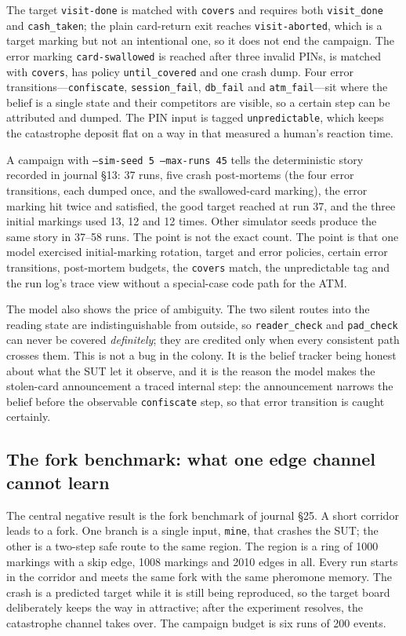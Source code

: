 \documentclass[11pt,a4paper]{article}
\begin{document}
The target \texttt{visit-done} is matched with \texttt{covers} and requires
both \texttt{visit\_done} and \texttt{cash\_taken}; the plain card-return
exit reaches \texttt{visit-aborted}, which is a target marking but not an
intentional one, so it does not end the campaign.  The error marking
\texttt{card-swallowed} is reached after three invalid PINs, is matched with
\texttt{covers}, has policy \texttt{until\_covered} and one crash dump.  Four
error transitions---\texttt{confiscate}, \texttt{session\_fail},
\texttt{db\_fail} and \texttt{atm\_fail}---sit where the belief is a single
state and their competitors are visible, so a certain step can be attributed
and dumped.  The PIN input is tagged \texttt{unpredictable}, which keeps the
catastrophe deposit flat on a way in that measured a human's reaction time.

A campaign with \texttt{--sim-seed 5 --max-runs 45} tells the deterministic
story recorded in journal \S13: 37 runs, five crash post-mortems (the four
error transitions, each dumped once, and the swallowed-card marking), the
error marking hit twice and satisfied, the good target reached at run 37, and
the three initial markings used 13, 12 and 12 times.  Other simulator seeds
produce the same story in 37--58 runs.  The point is not the exact count.  The
point is that one model exercised initial-marking rotation, target and error
policies, certain error transitions, post-mortem budgets, the
\texttt{covers} match, the unpredictable tag and the run log's trace view
without a special-case code path for the ATM.

The model also shows the price of ambiguity.  The two silent routes into the
reading state are indistinguishable from outside, so \texttt{reader\_check}
and \texttt{pad\_check} can never be covered \emph{definitely}; they are
credited only when every consistent path crosses them.  This is not a bug in
the colony.  It is the belief tracker being honest about what the SUT let it
observe, and it is the reason the model makes the stolen-card announcement a
traced internal step: the announcement narrows the belief before the
observable \texttt{confiscate} step, so that error transition is caught
certainly.

\subsection{The fork benchmark: what one edge channel cannot learn}

The central negative result is the fork benchmark of journal \S25.  A short
corridor leads to a fork.  One branch is a single input, \texttt{mine}, that
crashes the SUT; the other is a two-step safe route to the same region.  The
region is a ring of 1000 markings with a skip edge, 1008 markings and 2010
edges in all.  Every run starts in the corridor and meets the same fork with
the same pheromone memory.  The crash is a predicted target while it is still
being reproduced, so the target board deliberately keeps the way in
attractive; after the experiment resolves, the catastrophe channel takes
over.  The campaign budget is six runs of 200 events.
\end{document}

